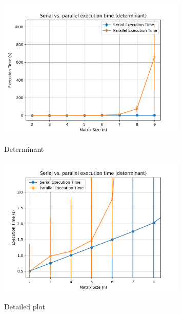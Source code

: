 \begin{figure}[H]
    \includegraphics[width=0.8\textwidth, keepaspectratio]{img/det_2_10_3.png}
    \centering
    \label{fig:det}
    \caption{Determinant}

    \includegraphics[width=0.8\textwidth, keepaspectratio]{img/det_2_10_3_detail.png}
    \centering
    \label{fig:det_detail}
    \caption{Detailed plot}
\end{figure}   


